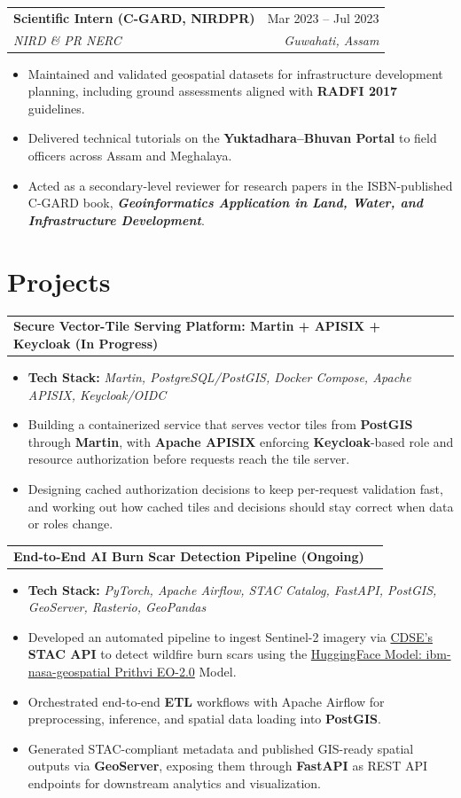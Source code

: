 \documentclass[letterpaper,11pt]{article}
\makeatletter
\newcommand{\resumeItem}[1]{
  \item\small{
    {#1 \vspace{-2pt}}
  }
}
\newcommand{\resumeSubheading}[4]{
  \vspace{-2pt}\item
    \begin{tabular*}{0.97\textwidth}[t]{l@{\extracolsep{\fill}}r}
      \textbf{#1} & #2 \\
      \textit{\small#3} & \textit{\small #4} \\
    \end{tabular*}\vspace{-7pt}
}
\newcommand{\resumeProjectHeading}[2]{
    \item
    \begin{tabular*}{0.97\textwidth}{l@{\extracolsep{\fill}}r}
      \small#1 & #2 \\
    \end{tabular*}\vspace{-7pt}
}
\newcommand{\resumeItemListStart}{\begin{itemize}}
\newcommand{\resumeItemListEnd}{\end{itemize}\vspace{-5pt}}
\makeatother
\begin{document}
      \resumeSubheading
  {Scientific Intern (C-GARD, NIRDPR)}{Mar 2023 -- Jul 2023}
  {NIRD \& PR NERC}{Guwahati, Assam}
\resumeItemListStart
\resumeItem{Maintained and validated geospatial datasets for infrastructure development planning, including ground assessments aligned with \textbf{RADFI 2017} guidelines.}
\resumeItem{Delivered technical tutorials on the \textbf{Yuktadhara--Bhuvan Portal} to field officers across Assam and Meghalaya.}
\resumeItem{Acted as a secondary-level reviewer for research papers in the ISBN-published C-GARD book, \textit{\textbf{Geoinformatics Application in Land, Water, and Infrastructure Development}}.}
\resumeItemListEnd

\vspace{-10pt}
\section{Projects} 
\vspace{-10pt}
\resumeProjectHeading
{\textbf{Secure Vector-Tile Serving Platform: Martin + APISIX + Keycloak (In Progress)}}{}
\resumeItemListStart
\resumeItem{\textbf{Tech Stack:}\textit{ Martin, PostgreSQL/PostGIS, Docker Compose, Apache APISIX, Keycloak/OIDC}}
\resumeItem{Building a containerized service that serves vector tiles from \textbf{PostGIS} through \textbf{Martin}, with \textbf{Apache APISIX} enforcing \textbf{Keycloak}-based role and resource authorization before requests reach the tile server.}
\resumeItem{Designing cached authorization decisions to keep per-request validation fast, and working out how cached tiles and decisions should stay correct when data or roles change.}
\resumeItemListEnd

\resumeProjectHeading 
{\textbf{End-to-End AI Burn Scar Detection Pipeline (Ongoing)}}{} 
\resumeItemListStart 
\resumeItem{\textbf{Tech Stack:}\textit{ PyTorch, Apache Airflow, STAC Catalog, FastAPI, PostGIS, GeoServer, Rasterio, GeoPandas}} 
\resumeItem{Developed an automated pipeline to ingest Sentinel-2 imagery via \href{https://dataspace.copernicus.eu/}{CDSE's} \textbf{STAC API} to detect wildfire burn scars using the \href{https://huggingface.co/ibm-nasa-geospatial/Prithvi-EO-2.0-300M-TL}{HuggingFace Model: ibm-nasa-geospatial Prithvi EO-2.0} Model.} 
\resumeItem{Orchestrated end-to-end \textbf{ETL} workflows with Apache Airflow for preprocessing, inference, and spatial data loading into \textbf{PostGIS}.} 
\resumeItem{Generated STAC-compliant metadata and published GIS-ready spatial outputs via \textbf{GeoServer}, exposing them through \textbf{FastAPI} as REST API endpoints for downstream analytics and visualization.} 
\resumeItemListEnd 
\end{document}
